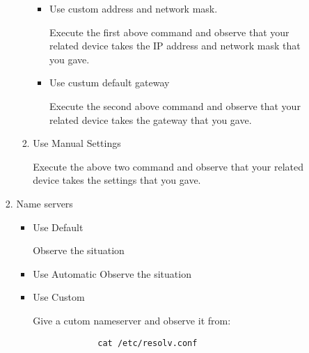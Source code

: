 \documentclass[a4paper,10pt]{article}
\begin{document}
\begin{enumerate}
\begin{enumerate}
\begin{enumerate}
\begin{enumerate}
\begin{itemize}
		  \item Use custom address and network mask. 
		
		   Execute the first above command and observe that your related device takes the IP address and network mask that you gave.
  
		  \item Use custum default gateway
		     
		      Execute the second above command and observe that your related device takes the gateway that you gave.
		\end{itemize}
	      \item Use Manual Settings
		    
		      Execute the above two command and observe that your related device takes the settings that you gave. 
	    \end{enumerate}
	  \item Name servers
	    \begin{itemize}
		 \item Use Default
		 
		  Observe the situation
		 \item Use Automatic
		  Observe the situation
	  
		 \item Use Custom

		  Give a cutom nameserver and observe it from:
		   \begin{verbatim}
		     cat /etc/resolv.conf
		  \end{verbatim}
	     \end{itemize}
      
	  \end{enumerate}	
      \end{enumerate}
\end{enumerate}
\end{document}
